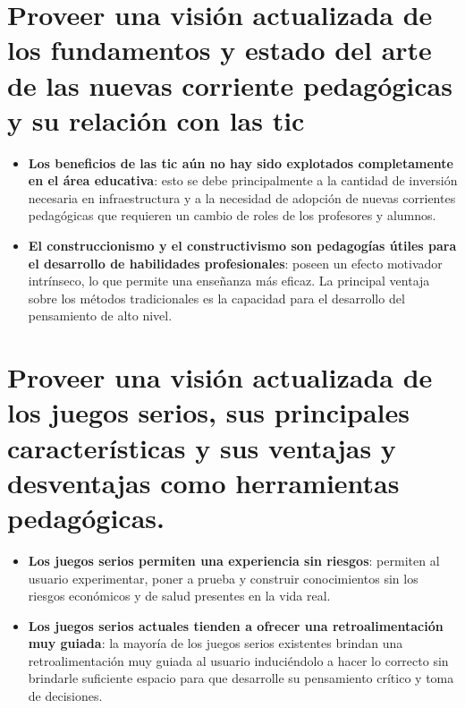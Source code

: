 \section[TIC en la educación]%
{Proveer una visión actualizada de los fundamentos y estado del arte de las nuevas corriente pedagógicas y su relación con las \gls{tic}}

\begin{itemize}

\item \textbf{Los beneficios de las \gls{tic} aún no hay sido explotados completamente en el área educativa}: esto se debe principalmente a la cantidad de inversión necesaria en infraestructura y a la necesidad de adopción de nuevas corrientes pedagógicas que requieren un cambio de roles de los profesores y alumnos\cite{unesco2013tics}.

\item \textbf{El construccionismo y el constructivismo son pedagogías útiles para el desarrollo de habilidades profesionales}: poseen un efecto motivador intrínseco, lo que permite una enseñanza más eficaz\cite{kim2005effects}. La principal ventaja sobre los métodos tradicionales es la capacidad para el desarrollo del pensamiento de alto nivel\cite{wilson2012constructivism}.

\end{itemize}

\section[Juegos Serios]%
{Proveer una visión actualizada de los juegos serios, sus principales características y sus ventajas y desventajas como herramientas pedagógicas.}

\begin{itemize}

\item \textbf{Los juegos serios permiten una experiencia sin riesgos}: permiten  al usuario experimentar, poner a prueba y construir conocimientos sin los riesgos económicos y de salud presentes en la vida real\cite{sg:aoverview}.

\item \textbf{Los juegos serios actuales tienden a ofrecer una retroalimentación muy guiada}: la mayoría de los juegos serios existentes brindan una retroalimentación muy guiada al usuario induciéndolo a hacer lo correcto sin brindarle suficiente espacio para que desarrolle su pensamiento crítico y toma de decisiones.

\end{itemize}

